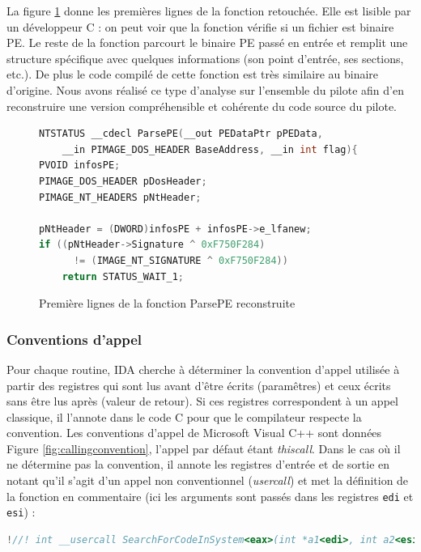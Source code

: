 La figure \ref{fig:ParsePEFinal} donne les premières lignes de la fonction retouchée.
Elle est lisible par un développeur C : on peut voir que la fonction vérifie si un fichier est binaire PE.
Le reste de la fonction parcourt le binaire PE passé en entrée et remplit une structure spécifique avec quelques informations (son point d'entrée, ses sections, etc.).
De plus le code compilé de cette fonction est très similaire au binaire d'origine.
Nous avons réalisé ce type d'analyse sur l'ensemble du pilote afin d'en reconstruire une version compréhensible et cohérente du code source du pilote.

\begin{figure}[h]
\begin{lstlisting}[language={C}]
NTSTATUS __cdecl ParsePE(__out PEDataPtr pPEData, 
    __in PIMAGE_DOS_HEADER BaseAddress, __in int flag){
PVOID infosPE;
PIMAGE_DOS_HEADER pDosHeader;
PIMAGE_NT_HEADERS pNtHeader;

pNtHeader = (DWORD)infosPE + infosPE->e_lfanew;
if ((pNtHeader->Signature ^ 0xF750F284) 
      != (IMAGE_NT_SIGNATURE ^ 0xF750F284)) 
    return STATUS_WAIT_1; 
\end{lstlisting}
\caption{Première lignes de la fonction ParsePE reconstruite\label{fig:ParsePEFinal}}
\end{figure}

\subsubsection{Conventions d'appel}

Pour chaque routine, IDA cherche à déterminer la convention d'appel utilisée à partir des registres qui sont lus avant d'être écrits (paramêtres) et ceux écrits sans être lus après (valeur de retour). Si ces registres correspondent à un appel classique, il l'annote dans le code C pour que le compilateur respecte la convention. Les conventions d'appel de Microsoft Visual C++ sont données Figure \ref{fig:callingconvention}, l'appel par défaut étant \emph{thiscall}. Dans le cas où il ne détermine pas la convention, il annote les registres d'entrée et de sortie en notant qu'il s'agit d'un appel non conventionnel (\emph{usercall}) et met la définition de la fonction en commentaire (ici les arguments sont passés dans les registres \texttt{edi} et \texttt{esi}) :
\begin{small}
\begin{lstlisting}[language={C}, escapechar=!]
!//! int __usercall SearchForCodeInSystem<eax>(int *a1<edi>, int a2<esi>);
\end{lstlisting}
\end{small}

